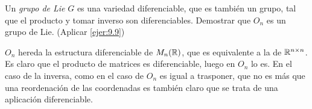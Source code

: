 \documentclass[twoside]{article}
\begin{document}
\begin{ejercicio}{9.10}
Un \emph{grupo de Lie} $G$ es una variedad diferenciable, que es también un grupo, tal que el producto y tomar inverso son diferenciables. Demostrar que $O_n$ es un grupo de Lie. (Aplicar \ref{ejer:9.9})
\end{ejercicio}
\begin{solucion}
$O_n$ hereda la estructura diferenciable de $M_n(\mathbb{R})$, que es equivalente a la de $\mathbb{R}^{n\times n}$. Es claro que el producto de matrices es diferenciable, luego en $O_n$ lo es. En el caso de la inversa, como en el caso de $O_n$ es igual a trasponer, que no es más que una reordenación de las coordenadas es también claro que se trata de una aplicación diferenciable.
\end{solucion}
\newpage

%
\end{document}
